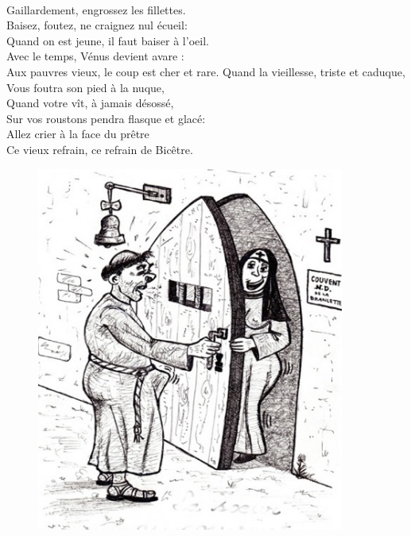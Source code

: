 \\Gaillardement, engrossez les fillettes.
\\Baisez, foutez, ne craignez nul écueil:
\\Quand on est jeune, il faut baiser à l'oeil.
\\Avec le temps, Vénus devient avare :
\\Aux pauvres vieux, le coup est cher et rare.
\breakpage
Quand la vieillesse, triste et caduque,
\\Vous foutra son pied à la nuque,
\\Quand votre vît, à jamais désossé,
\\Sur vos roustons pendra flasque et glacé:
\\Allez crier à la face du prêtre
\\Ce vieux refrain, ce refrain de Bicêtre.
\\
\bigskip
\begin{figure}[h!]
\centering
   \includegraphics[width=0.9\textwidth]{images/bicetre.jpg}
 \end{figure}

\breakpage